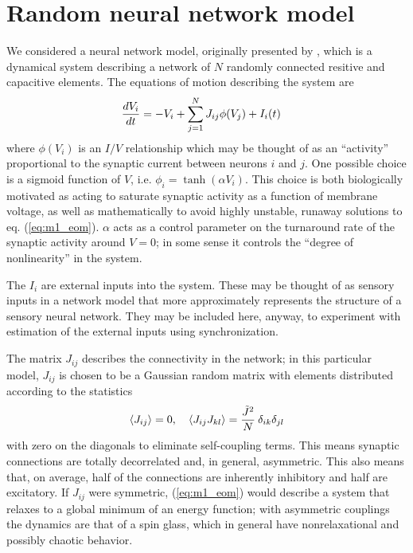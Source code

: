 \documentclass{article} %
\begin{document}
\section{Random neural network model}
We considered a neural network model, originally presented by \cite{Sompolinsky1988}, which is a dynamical system describing a network of $N$ randomly connected resitive and capacitive elements.  The equations of motion describing the system are
\begin{align}
	\frac{d V_i}{d t} &= -V_i + \sum_{j=1}^{N} J_{ij} \phi(V_j) \label{eq:m1_eom} + I_i(t)
\end{align}
where $\phi(V_i)$ is an $I/V$ relationship which may be thought of as an ``activity'' proportional to the synaptic current between neurons $i$ and $j$.    One possible choice is a sigmoid function of $V$, i.e. $\phi_i = \tanh\left(\alpha V_i\right)$.  This choice is both biologically motivated as acting to saturate synaptic activity as a function of membrane voltage, as well as mathematically to avoid highly unstable, runaway solutions to eq. (\ref{eq:m1_eom}).  $\alpha$ acts as a control parameter on the turnaround rate of the synaptic activity around $V = 0$; in some sense it controls the ``degree of nonlinearity'' in the system.

The $I_i$ are external inputs into the system.  These may be thought of as sensory inputs in a network model that more approximately represents the structure of a sensory neural network.  They may be included here, anyway, to experiment with estimation of the external inputs using synchronization.

The matrix $J_{ij}$ describes the connectivity in the network; in this particular model, $J_{ij}$ is chosen to be a Gaussian random matrix with elements distributed according to the statistics
\begin{align}
	\left\langle J_{ij} \right\rangle = 0, \quad \left\langle J_{ij}J_{kl} \right\rangle = \frac{\tilde{J}^2}{N} \: \delta_{ik}\delta_{jl} \label{eq:m1_stats}
\end{align}
with zero on the diagonals to eliminate self-coupling terms.  This means synaptic connections are totally decorrelated and, in general, asymmetric.  This also means that, on average, half of the connections are inherently inhibitory and half are excitatory.  If $J_{ij}$ were symmetric, (\ref{eq:m1_eom}) would describe a system that relaxes to a global minimum of an energy function; with asymmetric couplings the dynamics are that of a spin glass, which in general have nonrelaxational and possibly chaotic behavior.
\end{document}
